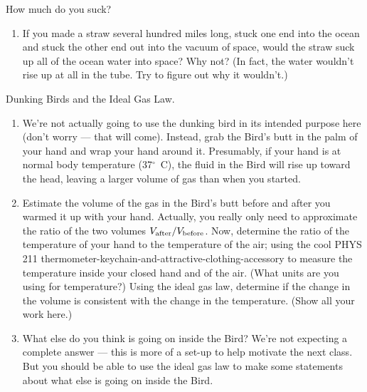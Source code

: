 \begin{aproblem}{How much do you suck?}
\begin{enumerate}
    {\bf Note:} What you have just done is a technique that is used
    all the time in the medical industry to measure lung performance
    in patients.  This is particularly useful for patients with lung
    cancer or various breathing disorders --- this kind of test can
    quickly and easily determine how well the lungs are functioning.

  \item If you made a straw several hundred miles long, stuck one end
    into the ocean and stuck the other end out into the vacuum of
    space, would the straw suck up all of the ocean water into space?
    Why not?  (In fact, the water wouldn't rise up at all in the tube.
    Try to figure out why it wouldn't.)
  \end{enumerate}
  \label{prob:suck}
\end{aproblem}


\begin{aproblem}{Dunking Birds and the Ideal Gas Law.}
  \begin{enumerate}
  \item We're not actually going to use the dunking bird in its
    intended purpose here (don't worry --- that will come).  Instead,
    grab the Bird's butt in the palm of your hand and wrap your hand
    around it.  Presumably, if your hand is at normal body temperature
    (37$^\circ$~C), the fluid in the Bird will rise up toward the
    head, leaving a larger volume of gas than when you started.

  \item Estimate the volume of the gas in the Bird's butt before and
    after you warmed it up with your hand.  Actually, you really only
    need to approximate the ratio of the two volumes $V_{\rm
      after}/V_{\rm before}$.  Now, determine the ratio of the
    temperature of your hand to the temperature of the air; using the
    cool PHYS 211
    thermometer-keychain-and-attractive-clothing-accessory to measure
    the temperature inside your closed hand and of the air.  (What
    units are you using for temperature?)  Using the ideal gas law,
    determine if the change in the volume is consistent with the
    change in the temperature.  (Show all your work here.)

  \item What else do you think is going on inside the Bird?  We're not
    expecting a complete answer --- this is more of a set-up to help
    motivate the next class.  But you should be able to use the ideal
    gas law to make some statements about what else is going on inside
    the Bird.
  \end{enumerate}
  \label{prob:birdI}
\end{aproblem}


